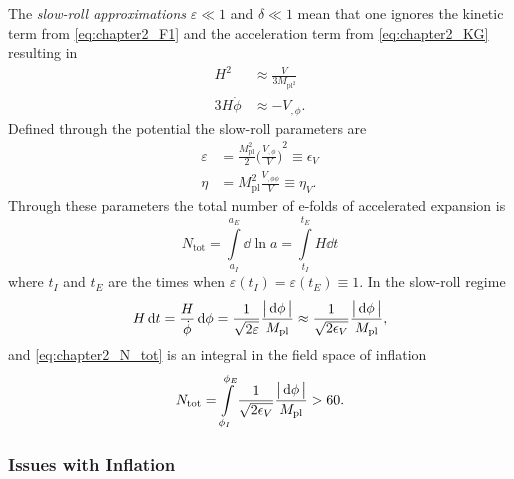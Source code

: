 The \emph{slow-roll approximations} \(\varepsilon \ll 1\) and \(\delta \ll 1\) mean that one ignores the kinetic term from \cref{eq:chapter2_F1} and the acceleration term from \cref{eq:chapter2_KG} resulting in
%
\begin{subequations}
	\begin{align}
		H^{2}        & \approx \frac{V}{3M_{\text{pl}^{2}}} \\
		3H\dot{\phi} & \approx -V_{,\phi}.
	\end{align}
\end{subequations}
%
Defined through the potential the slow-roll parameters are
%
\begin{subequations}
	\begin{align}
		\varepsilon & = \frac{M_{\text{pl}}^{2}}{2} {\bigg(\frac{V_{,\phi}}{V}\bigg)}^{2} \equiv \epsilon_{V} \\
		\eta        & = M_{\text{pl}}^{2} \frac{V_{,\phi\phi}}{V} \equiv \eta_{V}.
	\end{align}
\end{subequations}
%
Through these parameters the total number of e-folds of accelerated expansion is
%
\begin{equation}\label{eq:chapter2_N_tot}
	N_{\text{tot}}
	= \int\limits_{a_{I}}^{a_{E}} \dd{\ln{a}}
	= \int\limits_{t_{I}}^{t_{E}} H \dd{t}
\end{equation}
%
where \(t_{I}\) and \(t_{E}\) are the times when \(\varepsilon(t_{I}) = \varepsilon(t_{E}) \equiv 1\).
In the slow-roll regime
%
\begin{equation}
	H \dd{t}
	= \frac{H}{\dot{\phi}} \dd{\phi}
	= \frac{1}{\sqrt{2\varepsilon}} \frac{\big\lvert\dd{\phi}\big\rvert}{M_{\text{pl}}}
	\approx \frac{1}{\sqrt{2\epsilon_{V}}} \frac{\big\lvert\dd{\phi}\big\rvert}{M_{\text{pl}}},
\end{equation}
%
and \cref{eq:chapter2_N_tot} is an integral in the field space of inflation
%
\begin{equation}
	N_{\text{tot}}
	= \int\limits_{\phi_{I}}^{\phi_{E}}  \frac{1}{\sqrt{2\epsilon_{V}}} \frac{\big\lvert\dd{\phi}\big\rvert}{M_{\text{pl}}}
	> 60.
\end{equation}

\subsubsection{Issues with Inflation}

